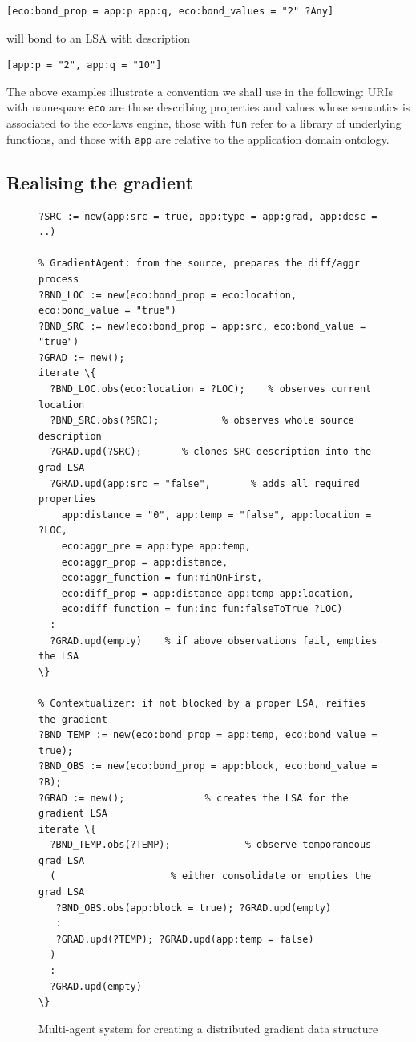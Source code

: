 \documentclass[12pt,a4paper,twoside,openright]{book}
\begin{document}
{\begin{Verbatim}[samepage=true, frame=single]
[eco:bond_prop = app:p app:q, eco:bond_values = "2" ?Any]
\end{Verbatim}
}

will bond to an LSA with description

{\begin{Verbatim}[samepage=true, frame=single]
[app:p = "2", app:q = "10"]
\end{Verbatim}
}

The above examples illustrate a convention we shall use in the following: URIs with namespace \texttt{eco} are those describing properties and values whose semantics is associated to the eco-laws engine, those with \texttt{fun} refer to a library of underlying functions, and those with \texttt{app} are relative to the application domain ontology.


\subsection{Realising the gradient}\label{s:grad}

\begin{figure}
{\footnotesize \begin{Verbatim}[samepage=true, frame=single, commandchars=\\\{\}]
% Source: injecting the source LSA at a POI
?SRC := new(app:src = true, app:type = app:grad, app:desc = ..)

% GradientAgent: from the source, prepares the diff/aggr process
?BND_LOC := new(eco:bond_prop = eco:location, eco:bond_value = "true")
?BND_SRC := new(eco:bond_prop = app:src, eco:bond_value = "true")
?GRAD := new();
iterate \{
  ?BND_LOC.obs(eco:location = ?LOC);    % observes current location
  ?BND_SRC.obs(?SRC);           % observes whole source description
  ?GRAD.upd(?SRC);       % clones SRC description into the grad LSA
  ?GRAD.upd(app:src = "false",       % adds all required properties
    app:distance = "0", app:temp = "false", app:location = ?LOC,
    eco:aggr_pre = app:type app:temp,
    eco:aggr_prop = app:distance,
    eco:aggr_function = fun:minOnFirst,
    eco:diff_prop = app:distance app:temp app:location,
    eco:diff_function = fun:inc fun:falseToTrue ?LOC)
  :
  ?GRAD.upd(empty)    % if above observations fail, empties the LSA
\}
    
% Contextualizer: if not blocked by a proper LSA, reifies the gradient
?BND_TEMP := new(eco:bond_prop = app:temp, eco:bond_value = true);
?BND_OBS := new(eco:bond_prop = app:block, eco:bond_value = ?B);
?GRAD := new();              % creates the LSA for the gradient LSA
iterate \{
  ?BND_TEMP.obs(?TEMP);             % observe temporaneous grad LSA
  (                    % either consolidate or empties the grad LSA    
   ?BND_OBS.obs(app:block = true); ?GRAD.upd(empty)
   :
   ?GRAD.upd(?TEMP); ?GRAD.upd(app:temp = false)
  )
  :
  ?GRAD.upd(empty) 
\}
\end{Verbatim}
}
\caption{Multi-agent system for creating a distributed gradient data structure}\label{f:grad}
\end{figure}
\end{document}
